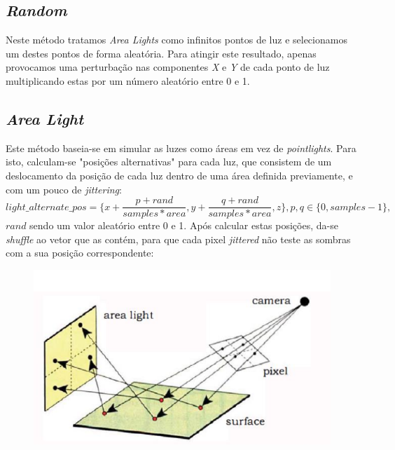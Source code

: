 \documentclass{article}
\begin{document}
        \subsection*{\textit{Random}}
            \par
	Neste método tratamos \textit{Area Lights} como infinitos pontos de luz e selecionamos um destes pontos de forma aleatória. Para atingir este resultado, apenas provocamos uma perturbação nas componentes \textit{X} e \textit{Y} de cada ponto de luz multiplicando estas por um número aleatório entre 0 e 1.
        \subsection*{\textit{Area Light}}
            \par
            Este método baseia-se em simular as luzes como áreas em vez de \textit{pointlights}. Para isto, calculam-se "posições alternativas" para cada luz, que consistem de um deslocamento da posição de cada luz dentro de uma área definida previamente, e com um pouco de \textit{jittering}:
            $$ light\_alternate\_pos = \{x + \frac{p + rand}{samples * area}, y + \frac{q + rand}{samples * area}, z\}, p,q \in \{0, samples - 1\},$$
            $rand$ sendo um valor aleatório entre 0 e 1. Após calcular estas posições, da-se \textit{shuffle} ao vetor que as contém, para que cada pixel \textit{jittered} não teste as sombras com a sua posição correspondente:
            \begin{figure}[h]
                \centering
                \includegraphics[scale=0.5]{area} 
            \end{figure}
\end{document}
